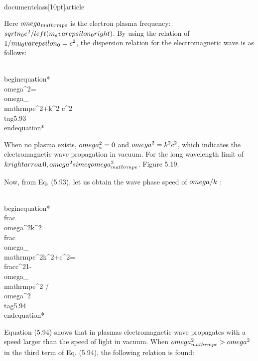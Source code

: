 \\documentclass[10pt]{article}
\begin{document}
{{{{Here $\\omega_{\\mathrm{pe}}$ is the electron plasma frequency: $\\sqrt{n_{0} e^{2} /\\left(m_{e} \\varepsilon_{0}\\right)}$. By using the relation of $1 / \\mu_{0} \\varepsilon_{0}=c^{2}$, the dispersion relation for the electromagnetic wave is as follows:


\\begin{equation*}
\\omega^{2}=\\omega_{\\mathrm{pe}}^{2}+k^{2} c^{2} \\tag{5.93}
\\end{equation*}


When no plasma exists, $\\omega_{e}^{2}=0$ and $\\omega^{2}=k^{2} c^{2}$, which indicates the electromagnetic wave propagation in vacuum. For the long wavelength limit of $k \\rightarrow 0, \\omega^{2} \\simeq \\omega_{\\mathrm{pe}}^{2}$. Figure 5.19.

Now, from Eq. (5.93), let us obtain the wave phase speed of $\\omega / k$ :


\\begin{equation*}
\\frac{\\omega^{2}}{k^{2}}=\\frac{\\omega_{\\mathrm{pe}}^{2}}{k^{2}}+c^{2}=\\frac{c^{2}}{1-\\omega_{\\mathrm{pe}}^{2} / \\omega^{2}} \\tag{5.94}
\\end{equation*}


Equation (5.94) shows that in plasmas electromagnetic wave propagates with a speed larger than the speed of light in vacuum. When $\\omega_{\\mathrm{pe}}^{2}>\\omega^{2}$ in the third term of Eq. (5.94), the following relation is found:


}}}}
\end{document}
